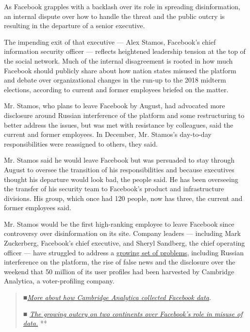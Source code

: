 As Facebook grapples with a backlash over its role in spreading
disinformation, an internal dispute over how to handle the threat and
the public outcry is resulting in the departure of a senior executive.

The impending exit of that executive --- Alex Stamos, Facebook's chief
information security officer --- reflects heightened leadership tension
at the top of the social network. Much of the internal disagreement is
rooted in how much Facebook should publicly share about how nation
states misused the platform and debate over organizational changes in
the run-up to the 2018 midterm elections, according to current and
former employees briefed on the matter.

Mr. Stamos, who plans to leave Facebook by August, had advocated more
disclosure around Russian interference of the platform and some
restructuring to better address the issues, but was met with resistance
by colleagues, said the current and former employees. In December, Mr.
Stamos's day-to-day responsibilities were reassigned to others, they
said.

Mr. Stamos said he would leave Facebook but was persuaded to stay
through August to oversee the transition of his responsibilities and
because executives thought his departure would look bad, the people
said. He has been overseeing the transfer of his security team to
Facebook's product and infrastructure divisions. His group, which once
had 120 people, now has three, the current and former employees said.

Mr. Stamos would be the first high-ranking employee to leave Facebook
since controversy over disinformation on its site. Company leaders ---
including Mark Zuckerberg, Facebook's chief executive, and Sheryl
Sandberg, the chief operating officer --- have struggled to address a
\href{https://www.nytimes3xbfgragh.onion/2018/03/18/us/cambridge-analytica-facebook-privacy-data.html}{growing
set of problems}, including Russian interference on the platform, the
rise of false news and the disclosure over the weekend that 50 million
of its user profiles had been harvested by Cambridge Analytica, a
voter-profiling company.

\begin{quote}
\emph{■}\href{https://www.nytimes3xbfgragh.onion/2018/03/17/us/politics/cambridge-analytica-trump-campaign.html?action=click\&module=Intentional\&pgtype=Article}{\emph{More
about how Cambridge Analytica collected Facebook data}}\emph{.}

\emph{■}
\href{https://www.nytimes3xbfgragh.onion/2018/03/18/us/cambridge-analytica-facebook-privacy-data.html?action=click\&module=Intentional\&pgtype=Article}{\emph{The
growing outcry on two continents over Facebook's role in misuse of
data.}} **
\end{quote}

